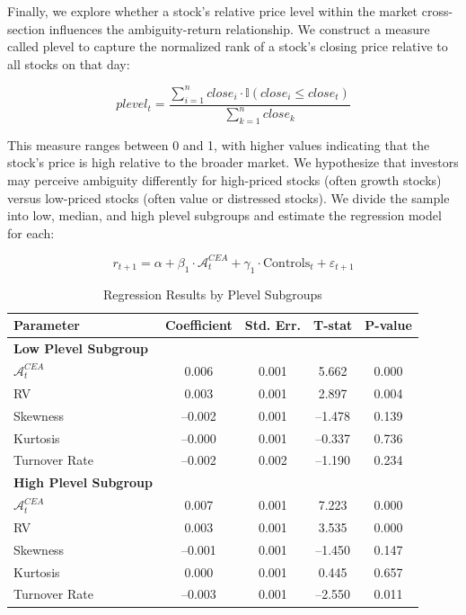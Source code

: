 \documentclass[preprint,12pt,authoryear]{elsarticle}
\begin{document}
Finally, we explore whether a stock's relative price level within the market cross-section influences the ambiguity-return relationship. We construct a measure called plevel to capture the normalized rank of a stock's closing price relative to all stocks on that day:

\begin{equation}
plevel_t = \frac{\sum_{i=1}^n close_i \cdot \mathbb{I}(close_i \leq close_t)}{\sum_{k=1}^n close_k}
\end{equation}

This measure ranges between 0 and 1, with higher values indicating that the stock's price is high relative to the broader market. We hypothesize that investors may perceive ambiguity differently for high-priced stocks (often growth stocks) versus low-priced stocks (often value or distressed stocks). We divide the sample into low, median, and high plevel subgroups and estimate the regression model for each:

\begin{equation}
r_{t+1} = \alpha + \beta_1 \cdot \mathcal{A}^{CEA}_t + \gamma_1 \cdot \mathrm{Controls}_t + \varepsilon_{t+1}
\end{equation}

\begin{table}[h!]
\centering
\caption{Regression Results by Plevel Subgroups}
\label{tab:plevel_subgroup_results}
\begin{tabularx}{\textwidth}{Xcccc}
\toprule
\textbf{Parameter} & \textbf{Coefficient} & \textbf{Std. Err.} & \textbf{T-stat} & \textbf{P-value} \\
\midrule
\textbf{Low Plevel Subgroup} & & & & \\
\(\mathcal{A}^{CEA}_t\) & 0.006 & 0.001 & 5.662 & 0.000 \\
RV & 0.003 & 0.001 & 2.897 & 0.004 \\
Skewness & –0.002 & 0.001 & –1.478 & 0.139 \\
Kurtosis & –0.000 & 0.001 & –0.337 & 0.736 \\
Turnover Rate & –0.002 & 0.002 & –1.190 & 0.234 \\
\midrule
\textbf{High Plevel Subgroup} & & & & \\
\(\mathcal{A}^{CEA}_t\) & 0.007 & 0.001 & 7.223 & 0.000 \\
RV & 0.003 & 0.001 & 3.535 & 0.000 \\
Skewness & –0.001 & 0.001 & –1.450 & 0.147 \\
Kurtosis & 0.000 & 0.001 & 0.445 & 0.657 \\
Turnover Rate & –0.003 & 0.001 & –2.550 & 0.011 \\
\bottomrule
\end{tabularx}
\end{table}
\end{document}
